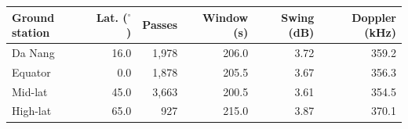 \begin{tabular}{lrrrrr}
\toprule
Ground station & Lat. ($^\circ$) & Passes & Window (s) & Swing (dB) & Doppler (kHz) \\
\midrule
Da Nang & 16.0 & 1,978 & 206.0 & 3.72 & 359.2 \\
Equator & 0.0 & 1,878 & 205.5 & 3.67 & 356.3 \\
Mid-lat & 45.0 & 3,663 & 200.5 & 3.61 & 354.5 \\
High-lat & 65.0 & 927 & 215.0 & 3.87 & 370.1 \\
\bottomrule
\end{tabular}
